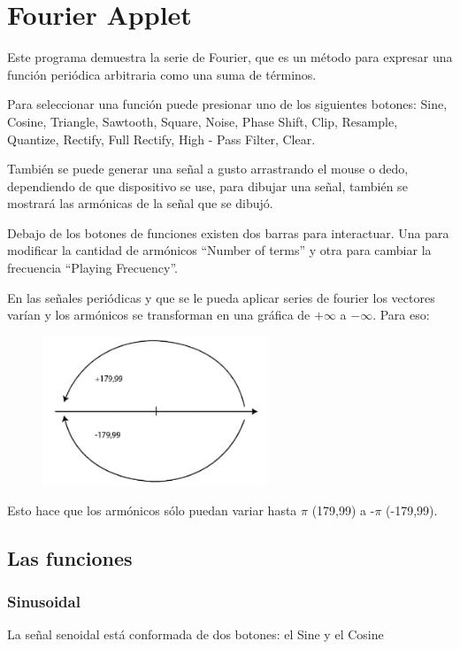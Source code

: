 \documentclass[../main.tex]{subfiles}
\begin{document}
\graphicspath{{../imagenes/fourier/applet/}}

\section{Fourier Applet}
Este programa demuestra la serie de Fourier, que es un método para expresar
una función periódica arbitraria como una suma de términos. 

Para seleccionar una función puede presionar uno de los siguientes botones:
Sine, Cosine, Triangle, Sawtooth, Square, Noise, Phase Shift, Clip,
Resample, Quantize, Rectify, Full Rectify, High - Pass Filter, Clear.

También se puede generar una señal a gusto arrastrando el mouse o dedo, dependiendo
de que dispositivo se use, para dibujar una señal, también se mostrará las armónicas
de la señal que se dibujó. 

Debajo de los botones de funciones existen dos barras para interactuar.
Una para modificar la cantidad de armónicos “Number of terms” y otra para
cambiar la frecuencia “Playing Frecuency”. 

En las señales periódicas y que se le pueda aplicar series de fourier los
vectores varían y los armónicos se transforman en una gráfica de
$+\infty$ a $-\infty$. Para eso:

\begin{figure}[H]
	\includegraphics[width=0.6\textwidth]{imagen1.png}
	\centering
\end{figure}

Esto hace que los armónicos sólo puedan variar hasta $\pi$ (179,99) a -$\pi$ (-179,99).
\subsection{Las funciones}
	\subsubsection{Sinusoidal}
	La señal senoidal está conformada de dos botones: el Sine y el Cosine
\end{document}

